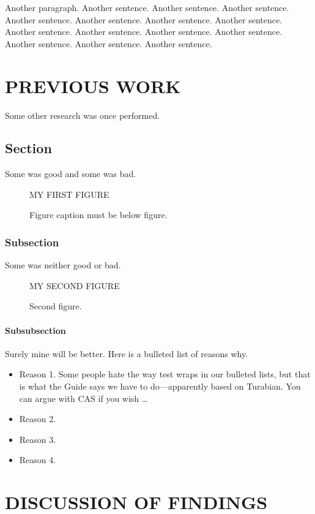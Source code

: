 \documentclass[12pt,econ]{sources/authesis}
\theoremstyle{definition}
\theoremstyle{definition}
\theoremstyle{definition}
\theoremstyle{remark}
\begin{document}
Another paragraph. Another sentence. Another sentence. Another sentence.
Another sentence. Another sentence. Another sentence. Another sentence.
Another sentence. Another sentence. Another sentence. Another sentence.
Another sentence. Another sentence. Another sentence.

\chapter{PREVIOUS WORK}\label{previous-work}

Some other research was once performed.

\section{Section}\label{section}

Some was good and some was bad.
\begin{figure}
\centering MY FIRST FIGURE
\caption{Figure caption must be below figure.}
\end{figure}
\subsection{Subsection}\label{subsection}

Some was neither good or bad.
\begin{figure}
\centering MY SECOND FIGURE
\caption{Second figure.}
\end{figure}
\subsubsection{Subsubsection}\label{subsubsection}

Surely mine will be better. Here is a bulleted list of reasons why.
\begin{itemize}
\item Reason 1.
Some people hate the way test wraps in our bulleted lists,
but that is what the Guide says we have to do---apparently based on Turabian.
You can argue with CAS if you wish \dots
\item Reason 2.
\item Reason 3.
\item Reason 4.
\end{itemize}
\chapter{DISCUSSION OF FINDINGS}\label{discussion-of-findings}
\end{document}

